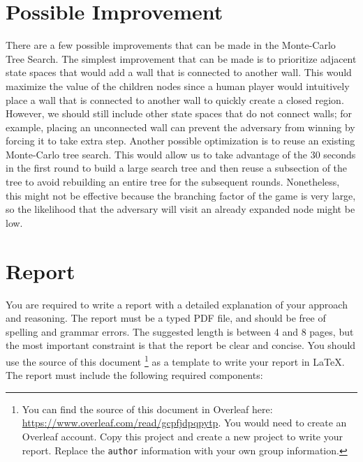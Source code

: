\documentclass[twoside,11pt]{article}
\begin{document}
\section{Possible Improvement}

There are a few possible improvements that can be made in the Monte-Carlo Tree Search.
The simplest improvement that can be made is to prioritize adjacent state spaces that would add a wall that is connected to another wall.
This would maximize the value of the children nodes since a human player would intuitively place a wall that is connected to another wall to quickly create a closed region.
However, we should still include other state spaces that do not connect walls;
for example, placing an unconnected wall can prevent the adversary from winning by forcing it to take extra step.
Another possible optimization is to reuse an existing Monte-Carlo tree search.
This would allow us to take advantage of the 30 seconds in the first round to build a large search tree and then reuse a subsection of the tree to avoid rebuilding an entire tree for the subsequent rounds.
Nonetheless, this might not be effective because the branching factor of the game is very large, so the likelihood that the adversary will visit an already expanded node might be low. 

\section{Report}

You are required to write a report with a detailed explanation of your approach and reasoning. The report must be a typed PDF file, and should be free of spelling and grammar errors. The suggested length is between 4 and 8 pages, but the most important constraint is that the report be clear and concise. You should use the source of this document \footnote{You can find the source of this document in Overleaf here: \href{https://www.overleaf.com/read/gcpfjdpqpytp}{https://www.overleaf.com/read/gcpfjdpqpytp}. You would need to create an Overleaf account. Copy this project and create a new project to write your report. Replace the \texttt{author} information with your own group information.} as a template to write your report in \LaTeX.  The report must include the following required components:
\end{document}
